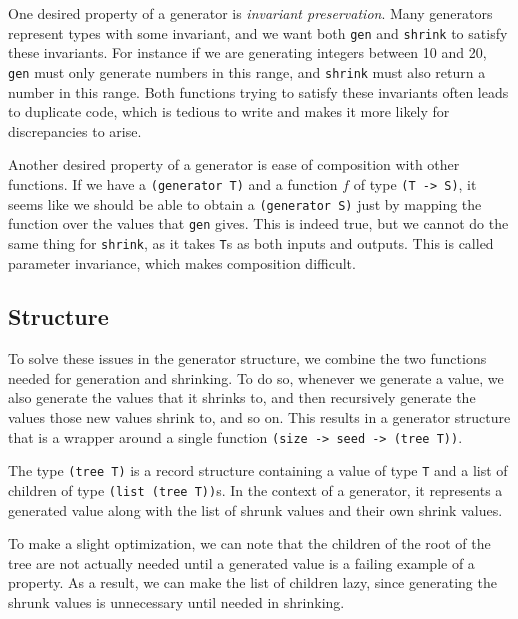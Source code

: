 \documentclass{scrartcl}
\begin{document}
One desired property of a generator is \emph{invariant preservation}.
Many generators represent types with some invariant,
and we want both \verb|gen| and \verb|shrink| to satisfy these invariants.
For instance if we are generating integers between 10 and 20,
\verb|gen| must only generate numbers in this range,
and \verb|shrink| must also return a number in this range.
Both functions trying to satisfy these invariants
often leads to duplicate code, which is tedious to write and
makes it more likely for discrepancies to arise.

Another desired property of a generator is
ease of composition with other functions.
If we have a \verb|(generator T)| and a function \(f\) of type \verb|(T -> S)|,
it seems like we should be able to obtain a \verb|(generator S)| just by
mapping the function over the values that \verb|gen| gives.
This is indeed true, but we cannot do the same thing for \verb|shrink|,
as it takes \verb|T|s as both inputs and outputs.
This is called parameter invariance, which makes composition difficult.

\subsection{Structure}
To solve these issues in the generator structure,
we combine the two functions needed for generation and shrinking.
To do so, whenever we generate a value,
we also generate the values that it shrinks to,
and then recursively generate the values those new values shrink to, and so on.
This results in a generator structure that is a wrapper around a single
function \verb|(size -> seed -> (tree T))|.

The type \verb|(tree T)| is a record structure containing
  a value of type \verb|T| and
  a list of children of type \verb|(list (tree T))|s.
In the context of a generator, it represents
  a generated value
  along with the list of shrunk values and their own shrink values.

To make a slight optimization, we can note that the children of the root
of the tree are not actually needed until a generated value is
a failing example of a property.
As a result, we can make the list of children lazy,
since generating the shrunk values is unnecessary until needed in shrinking.


\end{document}
